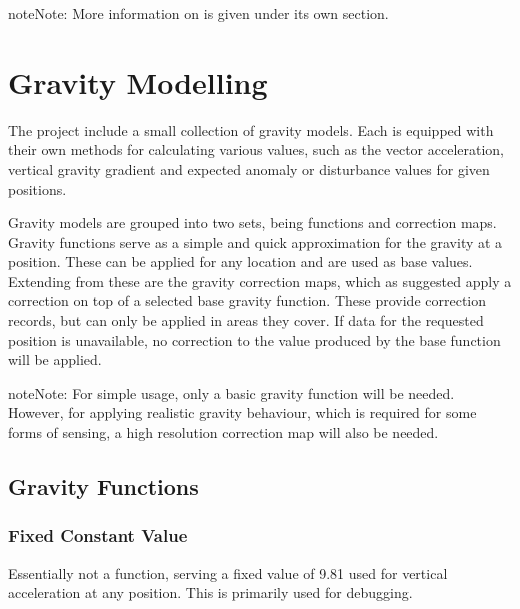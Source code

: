 \documentclass[letterpaper,10pt,english]{sphinxmanual}
\begin{document}
\begin{sphinxadmonition}{note}{Note:}
\sphinxAtStartPar
More information on {\hyperref[\detokenize{usage/gravity_modelling:gravity-modelling}]{}} is given under its own section.
\end{sphinxadmonition}

\sphinxstepscope


\section{Gravity Modelling}
\label{\detokenize{usage/gravity_modelling:gravity-modelling}}\label{\detokenize{usage/gravity_modelling::doc}}
\sphinxAtStartPar
The project include a small collection of gravity models. Each is equipped with their own methods for calculating
various values, such as the vector acceleration, vertical gravity gradient and expected anomaly or disturbance values
for given positions.

\sphinxAtStartPar
Gravity models are grouped into two sets, being functions and correction maps. Gravity functions serve as a simple
and quick approximation for the gravity at a position. These can be applied for any location and are used as base
values. Extending from these are the gravity correction maps, which as suggested apply a correction on top of a
selected base gravity function. These provide correction records, but can only be applied in areas they cover. If
data for the requested position is unavailable, no correction to the value produced by the base function will be
applied.

\begin{sphinxadmonition}{note}{Note:}
\sphinxAtStartPar
For simple usage, only a basic gravity function will be needed. However, for applying realistic gravity behaviour,
which is required for some forms of sensing, a high resolution correction map will also be needed.
\end{sphinxadmonition}


\subsection{Gravity Functions}
\label{\detokenize{usage/gravity_modelling:gravity-functions}}

\subsubsection{Fixed Constant Value}
\label{\detokenize{usage/gravity_modelling:fixed-constant-value}}
\sphinxAtStartPar
Essentially not a function, serving a fixed value of 9.81 used for vertical acceleration at any position.
This is primarily used for debugging.
\end{document}
